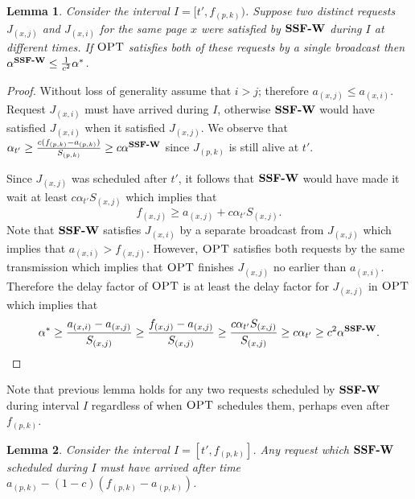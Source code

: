 \documentclass[11pt]{article}
\newtheorem{lemma}{Lemma}[section]
\newcommand{\opt}{\textrm{\sc OPT}}
\newcommand{\st}{S} \newcommand{\Algorithm}[1]{{\texttt{\bf{#1}}}} \newcommand{\sbg}{\Algorithm{SSF-W}} \newcommand{\sug}{\Algorithm{SSF}} \newcommand{\mmug}{\Algorithm{SSF-ID}}
\begin{document}
\begin{lemma}
  \label{lem:main}
  Consider the interval $I = [t', f_{(p,k)})$. Suppose two distinct
  requests $J_{(x,j)}$ and $J_{(x,i)}$ for the same page $x$ were
  satisfied by $\sbg$ during $I$ at different times. If $\opt$
  satisfies both of these requests by a single broadcast then
  $\alpha^{\sbg} \le \frac{1}{c^2} \alpha^*$.
\end{lemma}

\begin{proof}
  Without loss of generality assume that $i >j$; therefore $a_{(x,j)}
  \le a_{(x,i)}$. Request $J_{(x,i)}$ must have arrived during $I$,
  otherwise $\sbg$ would have satisfied $J_{(x,i)}$ when it satisfied
  $J_{(x,j)}$. We observe that $\alpha_{t'} \ge \frac{c(f_{(p,k)} -
    a_{(p,k)})}{\st_{(p,k)}} \ge c \alpha^{\sbg}$ since $J_{(p,k)}$ is
  still alive at $t'$.

  Since $J_{(x,j)}$ was scheduled after $t'$, it follows that $\sbg$ would
  have made it wait at least $c \alpha_{t'} \st_{(x,j)}$ which implies
  that
  \[
  f_{(x,j)} \ge a_{(x,j)} + c \alpha_{t'} \st_{(x,j)}.
  \]
  Note that $\sbg$ satisfies $J_{(x,i)}$ by a separate broadcast from
  $J_{(x,j)}$ which implies that $a_{(x,i)} > f_{(x,j)}$. However, $\opt$
  satisfies both requests by the same transmission which implies
  that $\opt$ finishes $J_{(x,j)}$ no earlier than $a_{(x,i)}$. Therefore
  the delay factor of $\opt$ is at least the delay factor for $J_{(x,j)}$ in
  $\opt$ which implies that
\[
\alpha^* \ge \frac{a_{(x,i)} - a_{(x,j)}}{\st_{(x,j)}} \ge
\frac{f_{(x,j)} - a_{(x,j)}}{\st_{(x,j)}} \ge \frac{c \alpha_{t'}
  \st_{(x,j)}}{\st_{(x,j)}} \ge c \alpha_{t'} \ge c^2 \alpha^{\sbg}.
\]
\end{proof}

Note that previous lemma holds for any two requests scheduled by
$\sbg$ during interval $I$ regardless of when $\opt$ schedules them,
perhaps even after $f_{(p,k)}$.

\begin{lemma}
  \label{lem:arrivaltime}
  Consider the interval $I = [t', f_{(p,k)}]$. Any request which
  $\sbg$ scheduled during $I$ must have arrived after time $a_{(p,k)} -
  (1-c)(f_{(p,k)} - a_{(p,k)})$.
\end{lemma}
\end{document}
